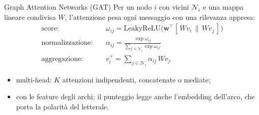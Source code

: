 \documentclass[aspectratio=169]{beamer}
\newcommand{\T}[2]{#2}
\newcommand{\T}[2]{#1}
\begin{document}
\begin{frame}{Graph Attention Networks (GAT)}
  \T{For a node $i$ with neighbors $\mathcal N_i$ and a shared linear map $W$, the attention
  weights each message by a learned relevance:}%
  {Per un nodo $i$ con vicini $\mathcal N_i$ e una mappa lineare condivisa $W$, l'attenzione
  pesa ogni messaggio con una rilevanza appresa:}
  \begin{align*}
    \text{score:}\quad & \omega_{ij}=\text{LeakyReLU}\big(\mathbf w^{\!\top}[\,W v_i \,\|\, W v_j\,]\big)\\
    \text{\T{normalize:}{normalizzazione:}}\quad & \alpha_{ij}=\frac{\exp \omega_{ij}}{\sum_{j'\in\mathcal N_i}\exp \omega_{ij'}}\\
    \text{\T{aggregate:}{aggregazione:}}\quad & v_i^{+}=\textstyle\sum_{j\in\mathcal N_i}\alpha_{ij}\,W v_j
  \end{align*}
  \begin{itemize}
    \item \T{multi-head: $K$ independent attentions, concatenated or averaged;}%
          {multi-head: $K$ attenzioni indipendenti, concatenate o mediate;}
    \item \T{edge-featured: the score also reads the embedding of the edge, which carries
          the polarity of the literal.}%
          {con le feature degli archi: il punteggio legge anche l'embedding dell'arco, che
          porta la polarit\`a del letterale.}
  \end{itemize}
\end{frame}
\end{document}
